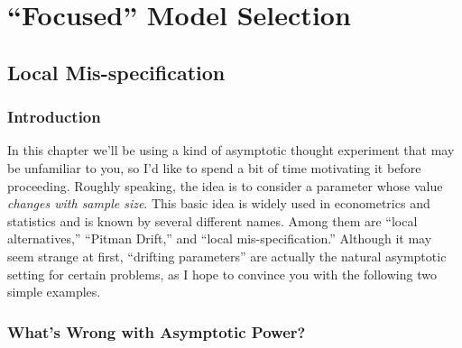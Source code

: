 \chapter{``Focused'' Model Selection}
\section{Local Mis-specification}

\subsection{Introduction}
In this chapter we'll be using a kind of asymptotic thought experiment that may be unfamiliar to you, so I'd like to spend a bit of time motivating it before proceeding. 
Roughly speaking, the idea is to consider a parameter whose value \emph{changes with sample size}. 
This basic idea is widely used in econometrics and statistics and is known by several different names. 
Among them are ``local alternatives,'' ``Pitman Drift,'' and ``local mis-specification.'' 
Although it may seem strange at first, ``drifting parameters'' are actually the natural asymptotic setting for certain problems, as I hope to convince you with the following two simple examples.

\subsection{What's Wrong with Asymptotic Power?}


